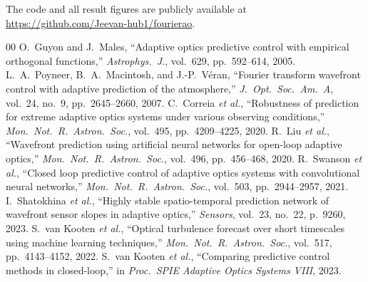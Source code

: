 \documentclass[conference]{IEEEtran}
\begin{document}
The code and all result figures are publicly available at \url{https://github.com/Jeevan-hub1/fourierao}.

\begin{thebibliography}{00}
 O.~Guyon and J.~Males, ``Adaptive optics predictive control with empirical orthogonal functions,'' \textit{Astrophys.\ J.}, vol.~629, pp.~592--614, 2005.
 L.~A.~Poyneer, B.~A.~Macintosh, and J.-P.~V\'{e}ran, ``Fourier transform wavefront control with adaptive prediction of the atmosphere,'' \textit{J.\ Opt.\ Soc.\ Am.\ A}, vol.~24, no.~9, pp.~2645--2660, 2007.
 C.~Correia \textit{et al.}, ``Robustness of prediction for extreme adaptive optics systems under various observing conditions,'' \textit{Mon.\ Not.\ R.\ Astron.\ Soc.}, vol.~495, pp.~4209--4225, 2020.
 R.~Liu \textit{et al.}, ``Wavefront prediction using artificial neural networks for open-loop adaptive optics,'' \textit{Mon.\ Not.\ R.\ Astron.\ Soc.}, vol.~496, pp.~456--468, 2020.
 R.~Swanson \textit{et al.}, ``Closed loop predictive control of adaptive optics systems with convolutional neural networks,'' \textit{Mon.\ Not.\ R.\ Astron.\ Soc.}, vol.~503, pp.~2944--2957, 2021.
 I.~Shatokhina \textit{et al.}, ``Highly stable spatio-temporal prediction network of wavefront sensor slopes in adaptive optics,'' \textit{Sensors}, vol.~23, no.~22, p.~9260, 2023.
 S.~van Kooten \textit{et al.}, ``Optical turbulence forecast over short timescales using machine learning techniques,'' \textit{Mon.\ Not.\ R.\ Astron.\ Soc.}, vol.~517, pp.~4143--4152, 2022.
 S.~van Kooten \textit{et al.}, ``Comparing predictive control methods in closed-loop,'' in \textit{Proc.\ SPIE Adaptive Optics Systems VIII}, 2023.
\end{thebibliography}
\end{document}
